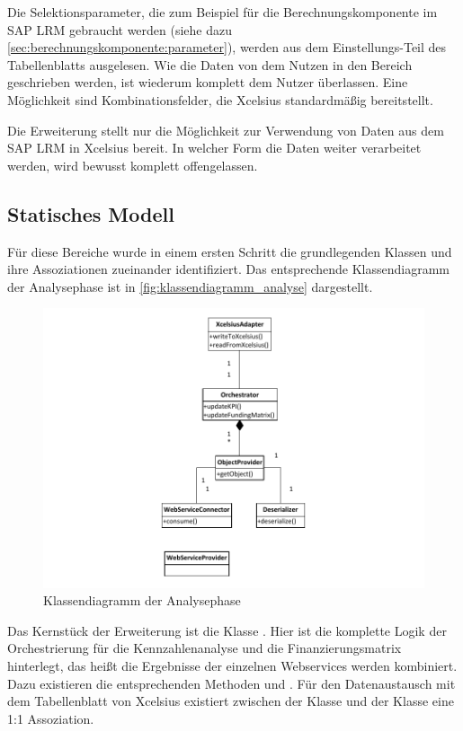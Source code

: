 \begin{onehalfspacing}
Die Selektionsparameter, die zum Beispiel für die Berechnungskomponente im SAP LRM gebraucht werden (siehe dazu \vref{sec:berechnungskomponente:parameter}), werden aus dem Einstellungs-Teil des Tabellenblatts ausgelesen. Wie die Daten von dem Nutzen in den Bereich geschrieben werden, ist wiederum komplett dem Nutzer überlassen. Eine Möglichkeit sind Kombinationsfelder, die \gls{Xcelsius} standardmäßig bereitstellt.

Die Erweiterung stellt nur die Möglichkeit zur Verwendung von Daten aus dem SAP LRM in \gls{Xcelsius} bereit. In welcher Form die Daten weiter verarbeitet werden, wird bewusst komplett offengelassen.

\subsection{Statisches Modell}
Für diese Bereiche wurde in einem ersten Schritt die grundlegenden Klassen und ihre Assoziationen zueinander identifiziert. Das entsprechende Klassendiagramm der Analysephase ist in \vref{fig:klassendiagramm_analyse} dargestellt.

\begin{figure}[h]
\centering
\setlength{\unitlength}{1mm}
\includegraphics[width=15cm]{Visio/Analyse.pdf}
\caption{Klassendiagramm der Analysephase \label{fig:klassendiagramm_analyse}}
\end{figure} 

Das Kernstück der Erweiterung ist die Klasse . Hier ist die komplette Logik der Orchestrierung für die Kennzahlenanalyse und die Finanzierungsmatrix hinterlegt, das heißt die Ergebnisse der einzelnen Webservices werden kombiniert. Dazu existieren die entsprechenden Methoden  und . Für den Datenaustausch mit dem Tabellenblatt von \gls{Xcelsius} existiert zwischen der Klasse  und der Klasse  eine 1:1 Assoziation.


\end{onehalfspacing}

